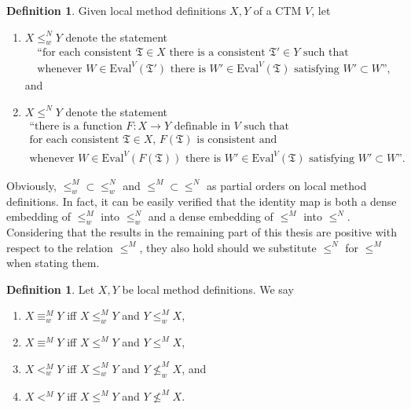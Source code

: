 \documentclass[12pt, twoside]{memoir}
\numberwithin{equation}{section}
\theoremstyle{definition}
\newtheorem{defi}[thm]{Definition}
\theoremstyle{remark}
\theoremstyle{definition}
\theoremstyle{definition}
\theoremstyle{definition}
\theoremstyle{remark}
\begin{document}
\begin{defi}
Given local method definitions $X, Y$ of a CTM $V$, let
\begin{enumerate}[label=(\arabic*)]
    \item $X \leq^N_w Y$ denote the statement
    \begin{gather*}
        \text{``for each consistent } \mathfrak{T} \in X \text{ there is a consistent } \mathfrak{T}' \in Y \text{ such that} \\ 
        \text{whenever } W \in \mathrm{Eval}^V(\mathfrak{T}') \text{ there is } W' \in \mathrm{Eval}^V(\mathfrak{T}) \text{ satisfying } W' \subset W \text{'',}
    \end{gather*}
    and
    \item $X \leq^N Y$ denote the statement
    \begin{gather*}
        \text{``there is a function } F : X \longrightarrow Y \text{ definable in } V \text{ such that} \\
        \text{for each consistent } \mathfrak{T} \in X \text{, } F(\mathfrak{T}) \text{ is consistent and} \\ \text{whenever } W \in \mathrm{Eval}^V(F(\mathfrak{T})) \text{ there is } W' \in \mathrm{Eval}^V(\mathfrak{T}) \text{ satisfying } W' \subset W \text{''.}
    \end{gather*}
\end{enumerate}
\end{defi}

Obviously, $\leq^M_w \subset \leq^N_w$ and $\leq^M \subset \leq^N$ as partial orders on local method definitions. In fact, it can be easily verified that the identity map is both a dense embedding of $\leq^M_w$ into $\leq^N_w$ and a dense embedding of $\leq^M$ into $\leq^N$. Considering that the results in the remaining part of this thesis are positive with respect to the relation $\leq^M$, they also hold should we substitute $\leq^N$ for $\leq^M$ when stating them. 

\begin{defi}
Let $X, Y$ be local method definitions. We say
\begin{enumerate}[label=(\arabic*)]
    \item $X \equiv^M_w Y$ iff $X \leq^M_w Y$ and $Y \leq^M_w X$,
    \item $X \equiv^M Y$ iff $X \leq^M Y$ and $Y \leq^M X$,
    \item $X <^M_w Y$ iff $X \leq^M_w Y$ and $Y \not\leq^M_w X$, and
    \item $X <^M Y$ iff $X \leq^M Y$ and $Y \not\leq^M X$.
\end{enumerate}
\end{defi}
\end{document}
